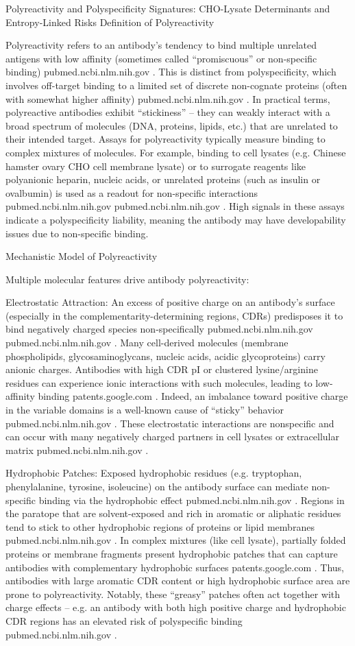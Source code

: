 Polyreactivity and Polyspecificity Signatures: CHO-Lysate Determinants and Entropy-Linked Risks
Definition of Polyreactivity

Polyreactivity refers to an antibody’s tendency to bind multiple unrelated antigens with low affinity (sometimes called “promiscuous” or non-specific binding)
pubmed.ncbi.nlm.nih.gov
. This is distinct from polyspecificity, which involves off-target binding to a limited set of discrete non-cognate proteins (often with somewhat higher affinity)
pubmed.ncbi.nlm.nih.gov
. In practical terms, polyreactive antibodies exhibit “stickiness” – they can weakly interact with a broad spectrum of molecules (DNA, proteins, lipids, etc.) that are unrelated to their intended target. Assays for polyreactivity typically measure binding to complex mixtures of molecules. For example, binding to cell lysates (e.g. Chinese hamster ovary CHO cell membrane lysate) or to surrogate reagents like polyanionic heparin, nucleic acids, or unrelated proteins (such as insulin or ovalbumin) is used as a readout for non-specific interactions
pubmed.ncbi.nlm.nih.gov
pubmed.ncbi.nlm.nih.gov
. High signals in these assays indicate a polyspecificity liability, meaning the antibody may have developability issues due to non-specific binding.

Mechanistic Model of Polyreactivity

Multiple molecular features drive antibody polyreactivity:

Electrostatic Attraction: An excess of positive charge on an antibody’s surface (especially in the complementarity-determining regions, CDRs) predisposes it to bind negatively charged species non-specifically
pubmed.ncbi.nlm.nih.gov
pubmed.ncbi.nlm.nih.gov
. Many cell-derived molecules (membrane phospholipids, glycosaminoglycans, nucleic acids, acidic glycoproteins) carry anionic charges. Antibodies with high CDR pI or clustered lysine/arginine residues can experience ionic interactions with such molecules, leading to low-affinity binding
patents.google.com
. Indeed, an imbalance toward positive charge in the variable domains is a well-known cause of “sticky” behavior
pubmed.ncbi.nlm.nih.gov
. These electrostatic interactions are nonspecific and can occur with many negatively charged partners in cell lysates or extracellular matrix
pubmed.ncbi.nlm.nih.gov
.

Hydrophobic Patches: Exposed hydrophobic residues (e.g. tryptophan, phenylalanine, tyrosine, isoleucine) on the antibody surface can mediate non-specific binding via the hydrophobic effect
pubmed.ncbi.nlm.nih.gov
. Regions in the paratope that are solvent-exposed and rich in aromatic or aliphatic residues tend to stick to other hydrophobic regions of proteins or lipid membranes
pubmed.ncbi.nlm.nih.gov
. In complex mixtures (like cell lysate), partially folded proteins or membrane fragments present hydrophobic patches that can capture antibodies with complementary hydrophobic surfaces
patents.google.com
. Thus, antibodies with large aromatic CDR content or high hydrophobic surface area are prone to polyreactivity. Notably, these “greasy” patches often act together with charge effects – e.g. an antibody with both high positive charge and hydrophobic CDR regions has an elevated risk of polyspecific binding
pubmed.ncbi.nlm.nih.gov
.

